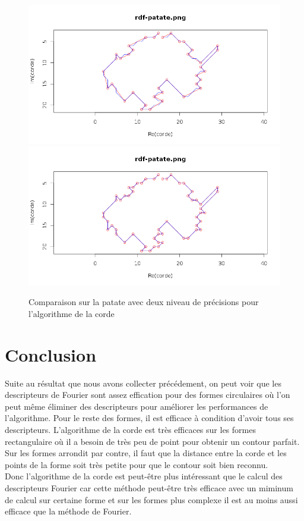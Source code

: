 \documentclass[11pt]{article}
\begin{document}
  \begin{center}
    \begin{figure}[!h]
      \includegraphics[width=15cm]{../resultat/comp_patate_impreci.png}
      \includegraphics[width=15cm]{../resultat/comp_patate_preci.png}
      \caption{Comparaison sur la patate avec deux niveau de précisions pour l'algorithme de la corde}
    \end{figure}
  \end{center}
  
  \newpage
    
  \section{Conclusion}
  Suite au résultat que nous avons collecter précédement, on peut voir que les descripteurs de Fourier sont assez
  effication pour des formes circulaires où l'on peut même éliminer des descripteurs pour améliorer les performances
  de l'algorithme. Pour le reste des formes, il est efficace à condition d'avoir tous ses descripteurs. L'algorithme
  de la corde est très efficaces sur les formes rectangulaire où il a besoin de très peu de point pour obtenir un 
  contour parfait. Sur les formes arrondit par contre, il faut que la distance entre la corde et les points de la forme
  soit très petite pour que le contour soit bien reconnu.\\
  
  Donc l'algorithme de la corde est peut-être plus intéressant que le calcul des descripteurs Fourier car cette méthode
  peut-être très efficace avec un miminum de calcul sur certaine forme et sur les formes plus complexe il est au moins
  aussi efficace que la méthode de Fourier.
  
\end{document}
